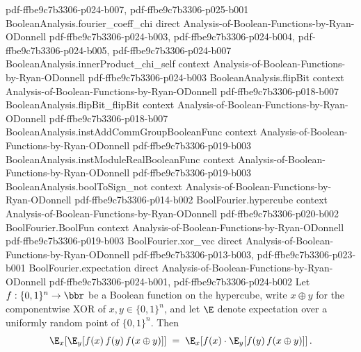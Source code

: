 \begin{lemma}
  {pdf-ffbe9c7b3306-p024-b007,
    pdf-ffbe9c7b3306-p025-b001}
\proofstep
  {BooleanAnalysis.fourier_coeff_chi}
  {direct}
  {Analysis-of-Boolean-Functions-by-Ryan-ODonnell}
  {pdf-ffbe9c7b3306-p024-b003,
    pdf-ffbe9c7b3306-p024-b004,
    pdf-ffbe9c7b3306-p024-b005,
    pdf-ffbe9c7b3306-p024-b007}
\proofstep
  {BooleanAnalysis.innerProduct_chi_self}
  {context}
  {Analysis-of-Boolean-Functions-by-Ryan-ODonnell}
  {pdf-ffbe9c7b3306-p024-b003}
\proofstep
  {BooleanAnalysis.flipBit}
  {context}
  {Analysis-of-Boolean-Functions-by-Ryan-ODonnell}
  {pdf-ffbe9c7b3306-p018-b007}
\proofstep
  {BooleanAnalysis.flipBit_flipBit}
  {context}
  {Analysis-of-Boolean-Functions-by-Ryan-ODonnell}
  {pdf-ffbe9c7b3306-p018-b007}
\proofstep
  {BooleanAnalysis.instAddCommGroupBooleanFunc}
  {context}
  {Analysis-of-Boolean-Functions-by-Ryan-ODonnell}
  {pdf-ffbe9c7b3306-p019-b003}
\proofstep
  {BooleanAnalysis.instModuleRealBooleanFunc}
  {context}
  {Analysis-of-Boolean-Functions-by-Ryan-ODonnell}
  {pdf-ffbe9c7b3306-p019-b003}
\proofstep
  {BooleanAnalysis.boolToSign_not}
  {context}
  {Analysis-of-Boolean-Functions-by-Ryan-ODonnell}
  {pdf-ffbe9c7b3306-p014-b002}
\proofstep
  {BoolFourier.hypercube}
  {context}
  {Analysis-of-Boolean-Functions-by-Ryan-ODonnell}
  {pdf-ffbe9c7b3306-p020-b002}
\proofstep
  {BoolFourier.BoolFun}
  {context}
  {Analysis-of-Boolean-Functions-by-Ryan-ODonnell}
  {pdf-ffbe9c7b3306-p019-b003}
\proofstep
  {BoolFourier.xor_vec}
  {direct}
  {Analysis-of-Boolean-Functions-by-Ryan-ODonnell}
  {pdf-ffbe9c7b3306-p013-b003,
    pdf-ffbe9c7b3306-p023-b001}
\proofstep
  {BoolFourier.expectation}
  {direct}
  {Analysis-of-Boolean-Functions-by-Ryan-ODonnell}
  {pdf-ffbe9c7b3306-p024-b001,
    pdf-ffbe9c7b3306-p024-b002}
Let $f : \{0,1\}^n \to \bbr$ be a Boolean function on the hypercube, write $x \oplus y$
for the componentwise XOR of $x, y \in \{0,1\}^n$, and let $\E$ denote expectation over
a uniformly random point of $\{0,1\}^n$. Then
\[
  \E_x\!\left[\E_y\!\left[f(x)\,f(y)\,f(x \oplus y)\right]\right]
  \;=\;
  \E_x\!\left[f(x)\cdot\E_y\!\left[f(y)\,f(x \oplus y)\right]\right].
\]
\end{lemma}

